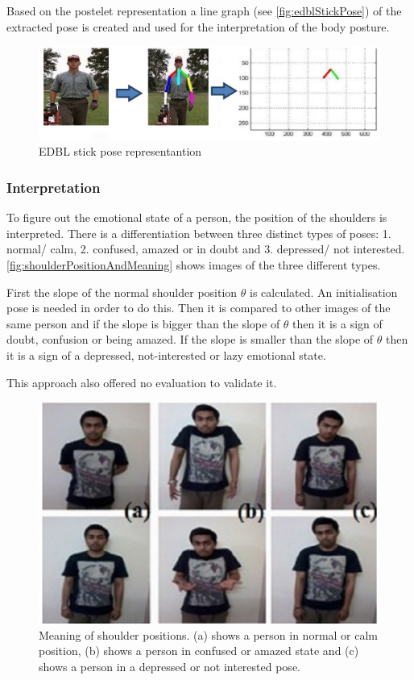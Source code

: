 \documentclass[conference]{IEEEtran}
\begin{document}
Based on the postelet representation a line graph (see \autoref{fig:edblStickPose}) of the extracted pose is created and used for the interpretation of the body posture. 

\begin{figure}[H]
\centering
\includegraphics[width=\linewidth]{edblStickPose.jpg}
\caption{EDBL stick pose representantion\cite{singh2015edbl}}
\label{fig:edblStickPose}
\end{figure}

\subsubsection{Interpretation}
To figure out the emotional state of a person, the position of the shoulders is interpreted. There is a differentiation between three distinct types of poses: 1. normal/ calm, 2. confused, amazed or in doubt and 3. depressed/ not interested. \autoref{fig:shoulderPositionAndMeaning} shows images of the three different types. 

First the slope of the normal shoulder position $\theta$ is calculated. An initialisation pose is needed in order to do this. Then it is compared to other images of the same person and if the slope is bigger than the slope of 	$\theta$ then it is a sign of doubt, confusion or being amazed. If the slope is smaller than the slope of $\theta$ then it is a sign of a depressed, not-interested or lazy emotional state.\

This approach also offered no evaluation to validate it. 
 
\begin{figure}[H]
\centering
\includegraphics[width=\linewidth]{shoulderPositionAndMeaning.jpg}
\caption{Meaning of shoulder positions. (a) shows a person in normal or calm position, (b) shows a person in confused or amazed state and (c) shows a person in a depressed or not interested pose.\cite{singh2015edbl}}
\label{fig:shoulderPositionAndMeaning}
\end{figure}
\end{document}
